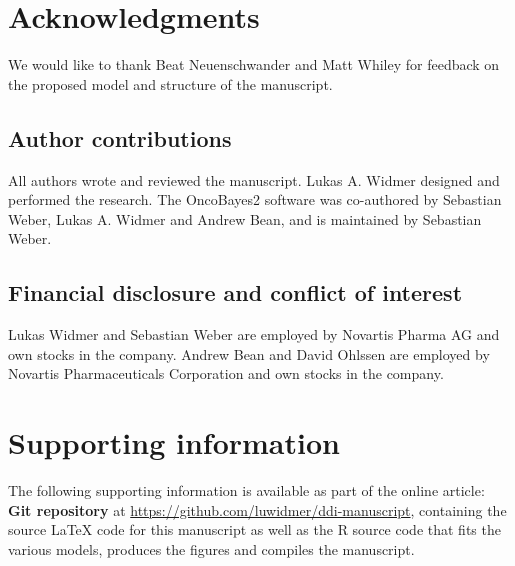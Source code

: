 \documentclass[AMA,STIX1COL]{WileyNJD-v2}
\begin{document}

\section*{Acknowledgments}
We would like to thank Beat Neuenschwander and Matt Whiley for feedback on the proposed model and structure of the manuscript.

\subsection*{Author contributions}
All authors wrote and reviewed the manuscript. Lukas A. Widmer designed and performed the research. The OncoBayes2 software was co-authored by Sebastian Weber, Lukas A. Widmer and Andrew Bean, and is maintained by Sebastian Weber.

\subsection*{Financial disclosure and conflict of interest}

Lukas Widmer and Sebastian Weber are employed by Novartis Pharma AG and own stocks in the company. Andrew Bean and David Ohlssen are employed by Novartis Pharmaceuticals Corporation and own stocks in the company.


\section*{Supporting information}

The following supporting information is available as part of the online article:
\\

\noindent
\textbf{Git repository} at \url{https://github.com/luwidmer/ddi-manuscript}, containing the source LaTeX code for this manuscript as well as the R source code that fits the various models, produces the figures and compiles the manuscript.


\appendix

\nocite{*}%
%
\end{document}
